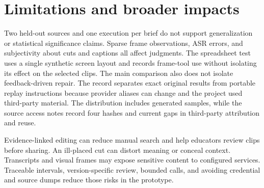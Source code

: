 \section{Limitations and broader impacts}
\label{sec:limitations}
Two held-out sources and one execution per brief do not support generalization or statistical significance claims. Sparse frame observations, ASR errors, and subjectivity about cuts and captions all affect judgments. The spreadsheet test uses a single synthetic screen layout and records frame-tool use without isolating its effect on the selected clips. The main comparison also does not isolate feedback-driven repair. The record separates exact original results from portable replay instructions because provider aliases can change and the project used third-party material. The distribution includes generated samples, while the source access notes record four hashes and current gaps in third-party attribution and reuse.

Evidence-linked editing can reduce manual search and help educators review clips before sharing. An ill-placed cut can distort meaning or conceal context. Transcripts and visual frames may expose sensitive content to configured services. Traceable intervals, version-specific review, bounded calls, and avoiding credential and source dumps reduce those risks in the prototype.


